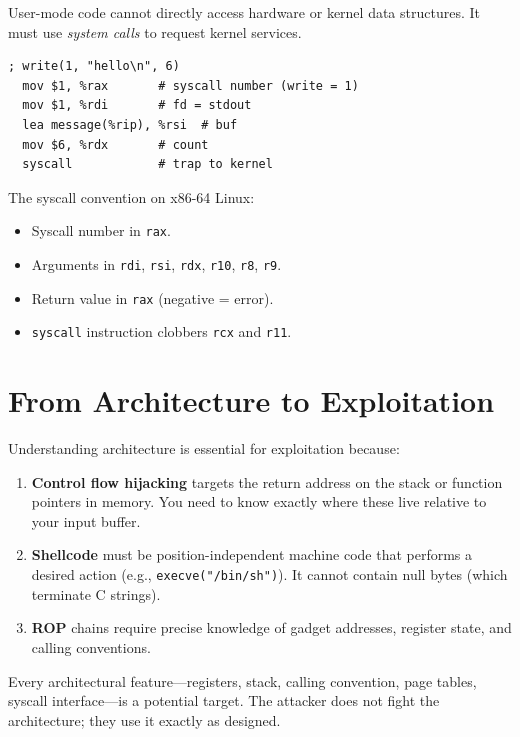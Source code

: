 User-mode code cannot directly access hardware or kernel data structures. It must use \emph{system calls} to request kernel services.

\begin{lstlisting}[caption=System call invocation on x86-64]
  ; write(1, "hello\n", 6)
  mov $1, %rax       # syscall number (write = 1)
  mov $1, %rdi       # fd = stdout
  lea message(%rip), %rsi  # buf
  mov $6, %rdx       # count
  syscall            # trap to kernel
\end{lstlisting}

The syscall convention on x86-64 Linux:
\begin{itemize}
	\item Syscall number in \texttt{rax}.
	\item Arguments in \texttt{rdi}, \texttt{rsi}, \texttt{rdx}, \texttt{r10}, \texttt{r8}, \texttt{r9}.
	\item Return value in \texttt{rax} (negative = error).
	\item \texttt{syscall} instruction clobbers \texttt{rcx} and \texttt{r11}.
\end{itemize}

\section{From Architecture to Exploitation}

Understanding architecture is essential for exploitation because:

\begin{enumerate}
	\item \textbf{Control flow hijacking} targets the return address on the stack or function pointers in memory. You need to know exactly where these live relative to your input buffer.
	\item \textbf{Shellcode} must be position-independent machine code that performs a desired action (e.g., \texttt{execve("/bin/sh")}). It cannot contain null bytes (which terminate C strings).
	\item \textbf{ROP} chains require precise knowledge of gadget addresses, register state, and calling conventions.
\end{enumerate}

\begin{principle}
	Every architectural feature---registers, stack, calling convention, page tables, syscall interface---is a potential target. The attacker does not fight the architecture; they use it exactly as designed.
\end{principle}

